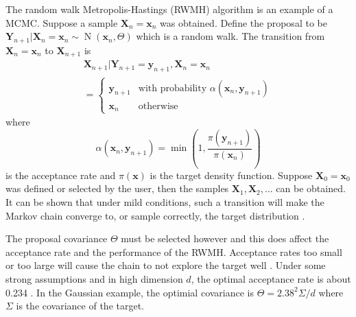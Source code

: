 \documentclass[10pt]{proc}
\DeclareMathOperator{\normal}{N}
\newcommand{\dotdotdot}{...}
\newcommand{\vect}[1]{\mathbf{#1}}
\newcommand{\matr}[1]{\mathsf{#1}}
\begin{document}
The random walk Metropolis-Hastings (RWMH) algorithm \citep{metropolis1953equation} \citep{hastings1970monte} is an example of a MCMC. Suppose a sample $\vect{X}_n = \vect{x}_n$ was obtained. Define the proposal to be $\vect{Y}_{n+1}|\vect{X}_n=\vect{x}_n \sim \normal\left(\vect{x}_n,\matr{\Theta}\right)$ which is a random walk. The transition from $\vect{X}_n=\vect{x}_n$ to $\vect{X}_{n+1}$ is
\begin{multline}
\vect{X}_{n+1}|\vect{Y}_{n+1} = \vect{y}_{n+1}, \vect{X}_{n} = \vect{x}_n
\\= 
	\begin{cases}
	\vect{y}_{n+1} & \text{with probability } \alpha\left(\vect{x}_n,\vect{y}_{n+1}\right) \\
	\vect{x}_n & \text{otherwise}
	\end{cases}
\end{multline}
where
\begin{equation}
\alpha\left(\vect{x}_{n},\vect{y}_{n+1}\right)=\min\left(1,\dfrac{\pi(\vect{y}_{n+1})}{\pi(\vect{x}_{n})}\right)
\end{equation}
is the acceptance rate and $\pi(\vect{x})$ is the target density function. Suppose $\vect{X}_0=\vect{x}_0$ was defined or selected by the user, then the samples $\vect{X}_1,\vect{X}_2,\dotdotdot$ can be obtained. It can be shown that under mild conditions, such a transition will make the Markov chain converge to, or sample correctly, the target distribution \citep{roberts1994simple}.

The proposal covariance $\matr{\Theta}$ must be selected however and this does affect the acceptance rate and the performance of the RWMH. Acceptance rates too small or too large will cause the chain to not explore the target well \citep{gelman1996efficient}. Under some strong assumptions and in high dimension $d$, the optimal acceptance rate is about 0.234 \citep{gelman1996efficient} \citep{roberts1997weak} \citep{rosenthal2011optimal}. In the Gaussian example, the optimial covariance is $\matr{\Theta}={2.38^2}\matr{\Sigma}/d$ where $\matr{\Sigma}$ is the covariance of the target.
\end{document}
